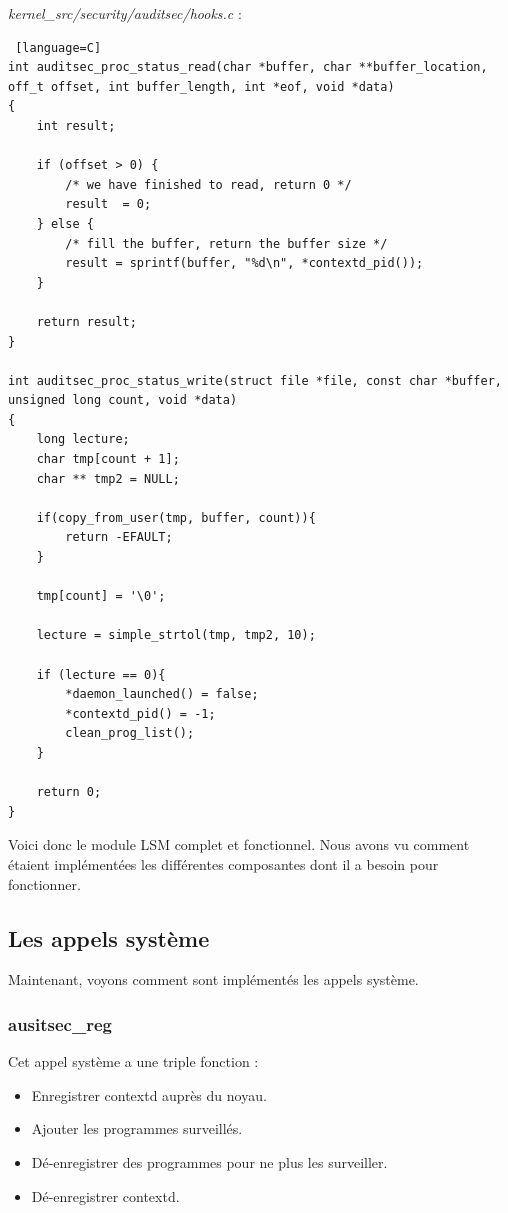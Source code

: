 \documentclass[pdftex,a4paper,titlepage,11pt]{article}
\begin{document}
\textit{{kernel\_src}/security/auditsec/hooks.c} :
\begin{lstlisting} [language=C]
int auditsec_proc_status_read(char *buffer, char **buffer_location,  off_t offset, int buffer_length, int *eof, void *data)
{
	int result;
	
	if (offset > 0) {
		/* we have finished to read, return 0 */
		result  = 0;
	} else {
		/* fill the buffer, return the buffer size */
		result = sprintf(buffer, "%d\n", *contextd_pid());
	}

	return result;
}

int auditsec_proc_status_write(struct file *file, const char *buffer, unsigned long count, void *data)
{
	long lecture;
	char tmp[count + 1];
	char ** tmp2 = NULL;

	if(copy_from_user(tmp, buffer, count)){ 
		return -EFAULT;
	}

	tmp[count] = '\0';

	lecture = simple_strtol(tmp, tmp2, 10);

	if (lecture == 0){
		*daemon_launched() = false;
		*contextd_pid() = -1;
		clean_prog_list();
	}

	return 0;
}
\end{lstlisting}

Voici donc le module LSM complet et fonctionnel. Nous avons vu comment étaient implémentées les différentes composantes dont il a besoin pour fonctionner.

\subsection{Les appels système}

Maintenant, voyons comment sont implémentés les appels système.

\subsubsection{ausitsec\_reg}

Cet appel système a une triple fonction :
\begin{itemize}
	\item Enregistrer contextd auprès du noyau.
	\item Ajouter les programmes surveillés.
	\item Dé-enregistrer des programmes pour ne plus les surveiller.
	\item Dé-enregistrer contextd.
\end{itemize}
\end{document}
